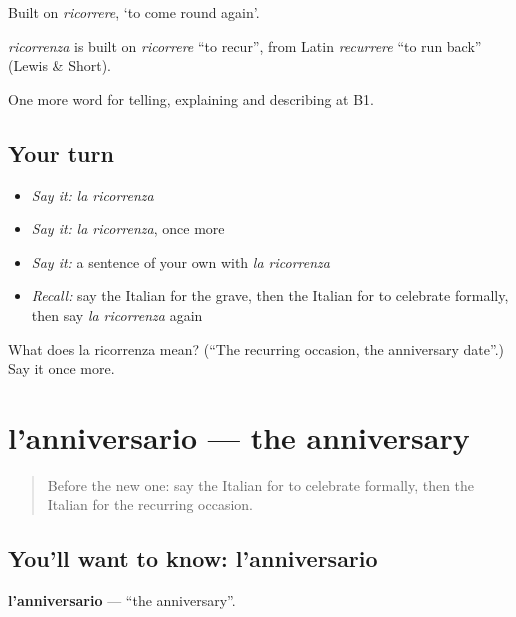 Built on \emph{ricorrere}, ‘to come round again’.

\begin{cousinweb}
\emph{ricorrenza} is built on \emph{ricorrere} \textquotedblleft{}to recur\textquotedblright{}, from Latin \emph{recurrere} \textquotedblleft{}to run back\textquotedblright{} (Lewis \& Short).
\end{cousinweb}

\begin{grammarlens}[title={What you've built}]
One more word for telling, explaining and describing at B1.
\end{grammarlens}

\subsection*{Your turn}
\begin{itemize}
\raggedright
  \item \emph{Say it:} \emph{la ricorrenza}
  \item \emph{Say it:} \emph{la ricorrenza}, once more
  \item \emph{Say it:} a sentence of your own with \emph{la ricorrenza}
  \item \emph{Recall:} say the Italian for the grave, then the Italian for to celebrate formally, then say \emph{la ricorrenza} again
\end{itemize}

\begin{tcolorbox}[breakable,colback=teal!4,colframe=teal!35!black,title={Before you move on}]
What does la ricorrenza mean? (\textquotedblleft{}The recurring occasion, the anniversary date\textquotedblright{}.) Say it once more.
\end{tcolorbox}
\section[l'anniversario]{l'anniversario — the anniversary}

\label{lesson:IT-C315-anniversario}



\begin{quote}
Before the new one: say the Italian for to celebrate formally, then the Italian for the recurring occasion.
\end{quote}

\subsection*{You'll want to know: l'anniversario}
\textbf{l'anniversario} — \textquotedblleft{}the anniversary\textquotedblright{}.

